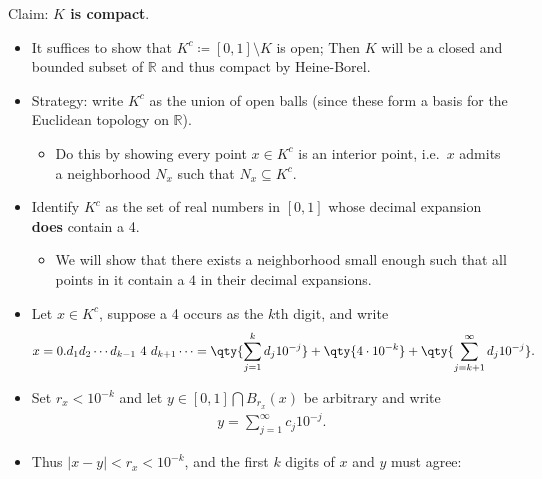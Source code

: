 \begin{solution}

\envlist

Claim: \textbf{\(K\) is compact}.

\begin{itemize}
\item
  It suffices to show that \(K^c \coloneqq[0, 1]\setminus K\) is open;
  Then \(K\) will be a closed and bounded subset of \({\mathbb{R}}\) and
  thus compact by Heine-Borel.
\item
  Strategy: write \(K^c\) as the union of open balls (since these form a
  basis for the Euclidean topology on \({\mathbb{R}}\)).

  \begin{itemize}
  \tightlist
  \item
    Do this by showing every point \(x\in K^c\) is an interior point,
    i.e.~\(x\) admits a neighborhood \(N_x\) such that
    \(N_x \subseteq K^c\).
  \end{itemize}
\item
  Identify \(K^c\) as the set of real numbers in \([0, 1]\) whose
  decimal expansion \textbf{does} contain a 4.

  \begin{itemize}
  \tightlist
  \item
    We will show that there exists a neighborhood small enough such that
    all points in it contain a \(4\) in their decimal expansions.
  \end{itemize}
\item
  Let \(x\in K^c\), suppose a 4 occurs as the \(k\)th digit, and write
  \begin{align*}  
  x = 0.d_1 d_2 \cdots d_{k-1}~ 4 ~d_{k+1}\cdots 
  = \qty{\sum_{j=1}^k d_j 10^{-j}} + \qty{4\cdot 10^{-k}} + \qty{\sum_{j=k+1}^\infty d_j 10^{-j}}
  .\end{align*}
\item
  Set \(r_x < 10^{-k}\) and let
  \(y \in [0, 1] \displaystyle\bigcap B_{r_x}(x)\) be arbitrary and
  write
  \begin{align*}  
  y = \sum_{j=1}^\infty c_j 10^{-j}
  .\end{align*}
\item
  Thus \({\left\lvert {x-y} \right\rvert} < r_x < 10^{-k}\), and the
  first \(k\) digits of \(x\) and \(y\) must agree:


\end{itemize}
\end{solution}
